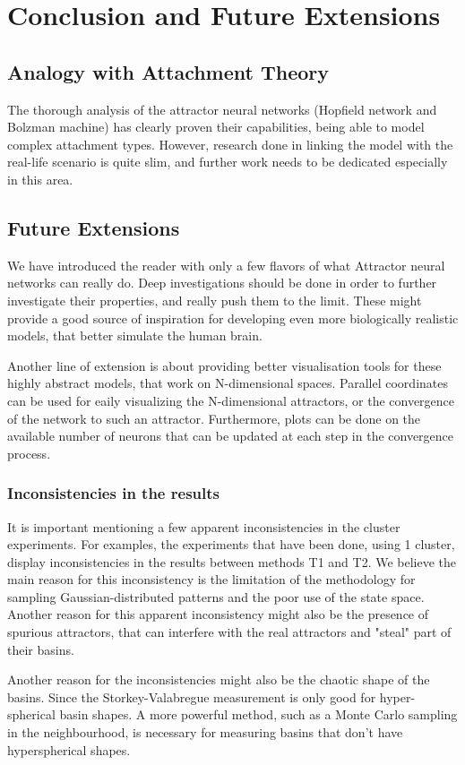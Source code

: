\chapter{Conclusion and Future Extensions}

\section{Analogy with Attachment Theory}

The thorough analysis of the attractor neural networks (Hopfield network and Bolzman machine) has clearly proven their capabilities, being able to model complex attachment types. However, research done in linking the model with the real-life scenario is quite slim, and further work needs to be dedicated especially in this area. 

\section{Future Extensions}

We have introduced the reader with only a few flavors of what Attractor neural networks can really do. Deep investigations should be done in order to further investigate their properties, and really push them to the limit. These might provide a good source of inspiration for developing even more biologically realistic models, that better simulate the human brain.

Another line of extension is about providing better visualisation tools for these highly abstract models, that work on N-dimensional spaces. Parallel coordinates can be used for eaily visualizing the N-dimensional attractors, or the convergence of the network to such an attractor. Furthermore, plots can be done on the available number of neurons that can be updated at each step in the convergence process. 

\subsection{Inconsistencies in the results}
\label{inconsistencies}

It is important mentioning a few apparent inconsistencies in the cluster experiments. For examples, the experiments that have been done, using 1 cluster, display inconsistencies in the results between methods T1 and T2. We believe the main reason for this inconsistency is the limitation of the methodology for sampling Gaussian-distributed patterns and the poor use of the state space. Another reason for this apparent inconsistency might also be the presence of spurious attractors, that can interfere with the real attractors and "steal" part of their basins.

Another reason for the inconsistencies might also be the chaotic shape of the basins. Since the Storkey-Valabregue measurement is only good for hyper-spherical basin shapes. A more powerful method, such as a Monte Carlo sampling in the neighbourhood, is necessary for measuring basins that don't have hyperspherical shapes. 